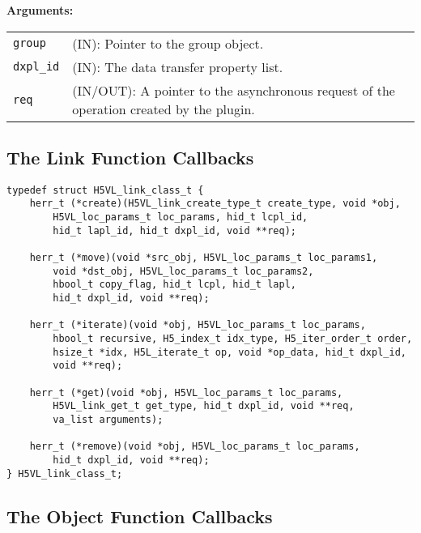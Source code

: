 \textbf{Arguments:}\\
\begin{tabular}{l p{10cm}}
  {\tt group} & (IN): Pointer to the group object.\\
  {\tt dxpl\_id} & (IN): The data transfer property list.\\
  {\tt req} & (IN/OUT): A pointer to the asynchronous request of the
  operation created by the plugin.\\
\end{tabular}

\subsection{The Link Function Callbacks}
\begin{lstlisting}
typedef struct H5VL_link_class_t {
    herr_t (*create)(H5VL_link_create_type_t create_type, void *obj,
        H5VL_loc_params_t loc_params, hid_t lcpl_id, 
        hid_t lapl_id, hid_t dxpl_id, void **req);

    herr_t (*move)(void *src_obj, H5VL_loc_params_t loc_params1,
        void *dst_obj, H5VL_loc_params_t loc_params2,
        hbool_t copy_flag, hid_t lcpl, hid_t lapl, 
        hid_t dxpl_id, void **req);

    herr_t (*iterate)(void *obj, H5VL_loc_params_t loc_params, 
        hbool_t recursive, H5_index_t idx_type, H5_iter_order_t order, 
        hsize_t *idx, H5L_iterate_t op, void *op_data, hid_t dxpl_id, 
        void **req);

    herr_t (*get)(void *obj, H5VL_loc_params_t loc_params, 
        H5VL_link_get_t get_type, hid_t dxpl_id, void **req, 
        va_list arguments);

    herr_t (*remove)(void *obj, H5VL_loc_params_t loc_params, 
        hid_t dxpl_id, void **req);
} H5VL_link_class_t;
\end{lstlisting}

\subsection{The Object Function Callbacks}

